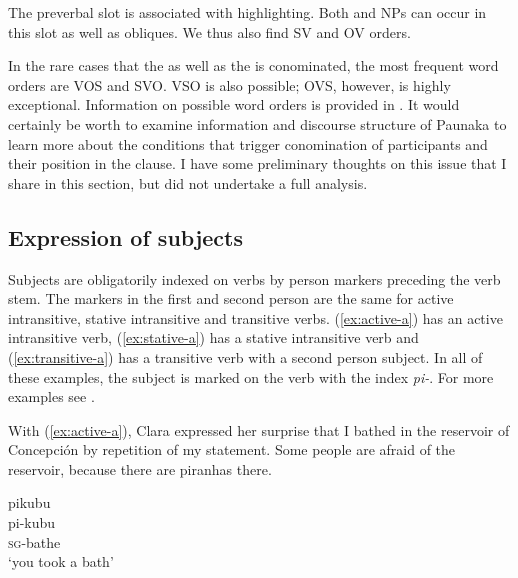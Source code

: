 The preverbal slot is associated with highlighting. Both  and  NPs can occur in this slot as well as obliques. We thus also find SV and OV orders. 


In the rare cases that the  as well as the  is conominated, the most frequent word orders are VOS and SVO. VSO is also possible; OVS, however, is highly exceptional. Information on possible word orders is provided in . It would certainly be worth to examine information and discourse structure of Paunaka to learn more about the conditions that trigger conomination of  participants and their position in the clause. I have some preliminary thoughts on this issue that I share in this section, but did not undertake a full analysis.

\subsection{Expression of subjects}\label{sec:ExpressionSubjects}


Subjects are obligatorily indexed on verbs by person markers preceding the verb stem. The markers in the first and second person are the same for active intransitive, stative intransitive and transitive verbs. (\ref{ex:active-a}) has an active intransitive verb, (\ref{ex:stative-a}) has a stative intransitive verb and (\ref{ex:transitive-a}) has a transitive verb with a second person subject. In all of these examples, the  subject is marked on the verb with the index \textit{pi-}. For more examples see .

With (\ref{ex:active-a}), Clara expressed her surprise that I bathed in the reservoir of Concepción by repetition of my statement. Some people are afraid of the reservoir, because there are piranhas there.

\ea\label{ex:active-a}
\begingl 
\glpreamble pikubu\\
\gla pi-kubu\\ 
\textsc{sg}-bathe\\ 
\glft ‘you took a bath’\\ 
\endgl
\trailingcitation{[cux-c120414ls-1.223]}
\xe

